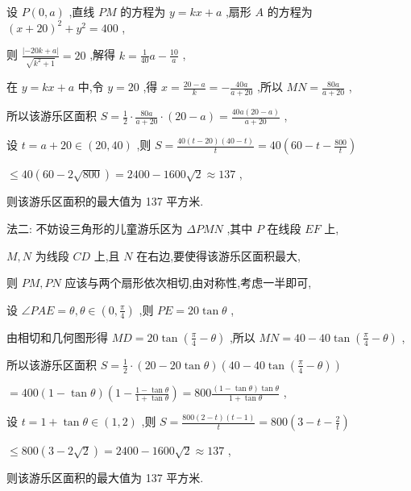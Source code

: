 \documentclass[10pt]{article}
\begin{document}
设 \(P\left( {0,a}\right)\) ,直线 \({PM}\) 的方程为 \(y = {kx} + a\) ,扇形 \(A\) 的方程为 \({\left( x + {20}\right) }^{2} + {y}^{2} = {400}\) ,

则 \(\frac{\left| -{20}k + a\right| }{\sqrt{{k}^{2} + 1}} = {20}\) ,解得 \(k = \frac{1}{40}a - \frac{10}{a}\) ,

在 \(y = {kx} + a\) 中,令 \(y = {20}\) ,得 \(x = \frac{{20} - a}{k} =  - \frac{40a}{a + {20}}\) ,所以 \({MN} = \frac{80a}{a + {20}}\) ,

所以该游乐区面积 \(S = \frac{1}{2} \cdot  \frac{80a}{a + {20}} \cdot  \left( {{20} - a}\right)  = \frac{{40a}\left( {{20} - a}\right) }{a + {20}}\) ,

设 \(t = a + {20} \in  \left( {{20},{40}}\right)\) ,则 \(S = \frac{{40}\left( {t - {20}}\right) \left( {{40} - t}\right) }{t} = {40}\left( {{60} - t - \frac{800}{t}}\right)\)

\(\leq  {40}\left( {{60} - 2\sqrt{800}}\right)  = {2400} - {1600}\sqrt{2} \approx  {137}\) ,

则该游乐区面积的最大值为 137 平方米.

法二: 不妨设三角形的儿童游乐区为 \({\Delta PMN}\) ,其中 \(P\) 在线段 \({EF}\) 上,

\(M,N\) 为线段 \({CD}\) 上,且 \(N\) 在右边,要使得该游乐区面积最大,

则 \({PM},{PN}\) 应该与两个扇形依次相切,由对称性,考虑一半即可,

设 \(\angle {PAE} = \theta ,\theta  \in  \left( {0,\frac{\pi }{4}}\right)\) ,则 \({PE} = {20}\tan \theta\) ,

由相切和几何图形得 \({MD} = {20}\tan \left( {\frac{\pi }{4} - \theta }\right)\) ,所以 \({MN} = {40} - {40}\tan \left( {\frac{\pi }{4} - \theta }\right)\) ,

所以该游乐区面积 \(S = \frac{1}{2} \cdot  \left( {{20} - {20}\tan \theta }\right) \left( {{40} - {40}\tan \left( {\frac{\pi }{4} - \theta }\right) }\right)\)

\(= {400}\left( {1 - \tan \theta }\right) \left( {1 - \frac{1 - \tan \theta }{1 + \tan \theta }}\right)  = {800}\frac{\left( {1 - \tan \theta }\right) \tan \theta }{1 + \tan \theta }\) ,

设 \(t = 1 + \tan \theta  \in  \left( {1,2}\right)\) ,则 \(S = \frac{{800}\left( {2 - t}\right) \left( {t - 1}\right) }{t} = {800}\left( {3 - t - \frac{2}{t}}\right)\)

\(\leq  {800}\left( {3 - 2\sqrt{2}}\right)  = {2400} - {1600}\sqrt{2} \approx  {137}\) ,

则该游乐区面积的最大值为 137 平方米.
\end{document}
